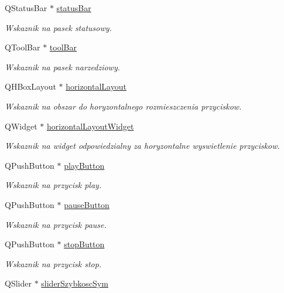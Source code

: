 \begin{DoxyCompactItemize}
Q\+Status\+Bar $\ast$ \hyperlink{class_okno_glowne_a40a10989bc6b318ac24e2457d7adb53b}{status\+Bar}
\begin{DoxyCompactList}\small\item\em Wskaznik na pasek statusowy. \end{DoxyCompactList}\item 
Q\+Tool\+Bar $\ast$ \hyperlink{class_okno_glowne_a6a37dd1f32605092fff7feac712bf429}{tool\+Bar}
\begin{DoxyCompactList}\small\item\em Wskaznik na pasek narzedziowy. \end{DoxyCompactList}\item 
Q\+H\+Box\+Layout $\ast$ \hyperlink{class_okno_glowne_aacb5ddb6d0eb560a47917cc1b457239a}{horizontal\+Layout}
\begin{DoxyCompactList}\small\item\em Wskaznik na obszar do horyzontalnego rozmieszczenia przyciskow. \end{DoxyCompactList}\item 
Q\+Widget $\ast$ \hyperlink{class_okno_glowne_a12ac2d00b9ca186176ccc710a928a723}{horizontal\+Layout\+Widget}
\begin{DoxyCompactList}\small\item\em Wskaznik na widget odpowiedzialny za horyzontalne wyswietlenie przyciskow. \end{DoxyCompactList}\item 
Q\+Push\+Button $\ast$ \hyperlink{class_okno_glowne_a50f936486c1bc3b3278823a8eb90841e}{play\+Button}
\begin{DoxyCompactList}\small\item\em Wskaznik na przycisk play. \end{DoxyCompactList}\item 
Q\+Push\+Button $\ast$ \hyperlink{class_okno_glowne_a0dde8df8a49b8f47f17f8e748fd15967}{pause\+Button}
\begin{DoxyCompactList}\small\item\em Wskaznik na przycisk pause. \end{DoxyCompactList}\item 
Q\+Push\+Button $\ast$ \hyperlink{class_okno_glowne_a3051d73dc0e0a27dc30ada43cc6b63c4}{stop\+Button}
\begin{DoxyCompactList}\small\item\em Wskaznik na przycisk stop. \end{DoxyCompactList}\item 
Q\+Slider $\ast$ \hyperlink{class_okno_glowne_a85328893065393400d5a0344004ca78b}{slider\+Szybkosc\+Sym}

\end{DoxyCompactItemize}
